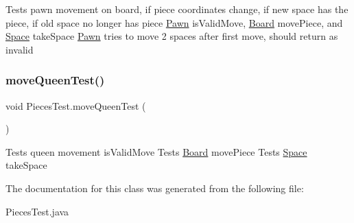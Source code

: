 Tests pawn movement on board, if piece coordinates change, if new space has the piece, if old space no longer has piece \mbox{\hyperlink{class_pawn}{Pawn}} is\+Valid\+Move, \mbox{\hyperlink{class_board}{Board}} move\+Piece, and \mbox{\hyperlink{class_space}{Space}} take\+Space \mbox{\hyperlink{class_pawn}{Pawn}} tries to move 2 spaces after first move, should return as invalid \mbox{\label{class_pieces_test_abadaa0c61122f01bae430ba068296914}} 
\subsubsection{\texorpdfstring{moveQueenTest()}{moveQueenTest()}}
{\footnotesize\ttfamily void Pieces\+Test.\+move\+Queen\+Test (\begin{DoxyParamCaption}{ }\end{DoxyParamCaption})\hspace{0.3cm}{\ttfamily [inline]}}

Tests queen movement is\+Valid\+Move Tests \mbox{\hyperlink{class_board}{Board}} move\+Piece Tests \mbox{\hyperlink{class_space}{Space}} take\+Space 

The documentation for this class was generated from the following file\+:\begin{DoxyCompactItemize}
\item 
Pieces\+Test.\+java\end{DoxyCompactItemize}
